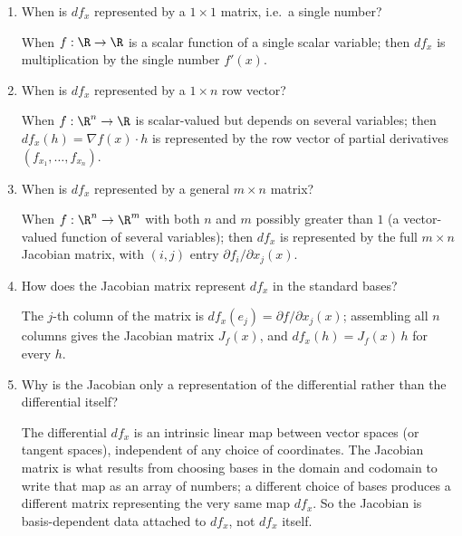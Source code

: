 \documentclass{self-check}
\begin{document}
\begin{enumerate}[resume, leftmargin=*, itemsep=8pt]
    \begin{answer}
      Once bases are chosen for the domain and codomain, any linear map between finite-dimensional spaces is represented by a matrix; since \(df_{x}\) is linear, it is represented, in the standard bases, by the Jacobian matrix of \(f\) at \(x\).
    \end{answer}
  \item When is \(df_{x}\) represented by a \(1\times1\) matrix, i.e.\ a single number?
    \begin{answer}
      When \(f:\R\to\R\) is a scalar function of a single scalar variable; then \(df_{x}\) is multiplication by the single number \(f'(x)\).
    \end{answer}
  \item When is \(df_{x}\) represented by a \(1\times n\) row vector?
    \begin{answer}
      When \(f:\R^{n}\to\R\) is scalar-valued but depends on several variables; then \(df_{x}(h)=\nabla f(x)\cdot h\) is represented by the row vector of partial derivatives \((f_{x_{1}},\dots,f_{x_{n}})\).
    \end{answer}
  \item When is \(df_{x}\) represented by a general \(m\times n\) matrix?
    \begin{answer}
      When \(f:\R^{n}\to\R^{m}\) with both \(n\) and \(m\) possibly greater than \(1\) (a vector-valued function of several variables); then \(df_{x}\) is represented by the full \(m\times n\) Jacobian matrix, with \((i,j)\) entry \(\partial f_{i}/\partial x_{j}(x)\).
    \end{answer}
  \item How does the Jacobian matrix represent \(df_{x}\) in the standard bases?
    \begin{answer}
      The \(j\)-th column of the matrix is \(df_{x}(e_{j})=\partial f/\partial x_{j}(x)\); assembling all \(n\) columns gives the Jacobian matrix \(J_{f}(x)\), and \(df_{x}(h)=J_{f}(x)\,h\) for every \(h\).
    \end{answer}
  \item Why is the Jacobian only a representation of the differential rather than the differential itself?
    \begin{answer}
      The differential \(df_{x}\) is an intrinsic linear map between vector spaces (or tangent spaces), independent of any choice of coordinates. The Jacobian matrix is what results from choosing bases in the domain and codomain to write that map as an array of numbers; a different choice of bases produces a different matrix representing the very same map \(df_{x}\). So the Jacobian is basis-dependent data attached to \(df_{x}\), not \(df_{x}\) itself.
    \end{answer}
\end{enumerate}
\end{document}
